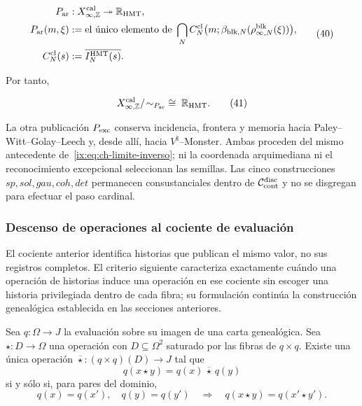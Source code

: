 \[
\begin{aligned}
 P_{\rm ar}&:X_{\infty,\mathbb Z}^{\rm cal}
     \twoheadrightarrow\mathbb R_{\rm HMT},\\
 P_{\rm ar}(m,\xi)
   &:=\text{el único elemento de }
     \bigcap_N C_N^{\rm cl}
       \bigl(m;\beta_{{\rm blk},N}(\rho^{\rm blk}_{\infty,N}(\xi))\bigr),\\
 C_N^{\rm cl}(s)&:=\overline{I_N^{\rm HMT}(s)}.
\end{aligned}
\tag{40}\label{ix:eq:ch-proyeccion-arquimediana}
\]

Por tanto,

\[
 X_{\infty,\mathbb Z}^{\rm cal}/\!\sim_{P_{\rm ar}}
 \;\cong\;\mathbb R_{\rm HMT}.
\tag{41}\label{ix:eq:ch-cociente-recta}
\]

La otra publicación \(P_{\rm exc}\) conserva incidencia, frontera y memoria
hacia Paley--Witt--Golay--Leech y, desde allí, hacia
\(V^\natural\)--Monster. Ambas proceden del
mismo antecedente de~\eqref{ix:eq:ch-limite-inverso}; ni la coordenada arquimediana ni el reconocimiento
excepcional seleccionan las semillas. Las cinco construcciones
\(sp,sol,gau,coh,det\) permanecen consustanciales dentro de
\(\mathcal C_{\rm cont}^{\rm disc}\) y no se disgregan para efectuar el paso
cardinal.


\subsubsection{Descenso de operaciones al cociente de evaluación}
\label{ix:sec:ch-descenso-fibras}

El cociente anterior identifica historias que publican el mismo valor, no
sus registros completos. El criterio siguiente caracteriza exactamente
cuándo una operación de historias induce una operación en ese cociente sin
escoger una historia privilegiada dentro de cada fibra; su formulación
continúa la construcción genealógica establecida en las secciones anteriores.

\begin{proposition}
\label{ix:prop:ch-descenso-fibras}
Sea \(q:\Omega\to J\) la evaluación sobre su imagen de una carta
genealógica. Sea \(\star:D\to\Omega\) una operación con
\(D\subseteq\Omega^2\) saturado por las fibras de \(q\times q\).
Existe una única operación
\(\overline\star:(q\times q)(D)\to J\) tal que
\[
 q(x\star y)=q(x)\,\overline\star\,q(y)
\]
si y sólo si, para pares del dominio,
\[
 q(x)=q(x'),\quad q(y)=q(y')
 \quad\Longrightarrow\quad q(x\star y)=q(x'\star y').
\]
\end{proposition}

